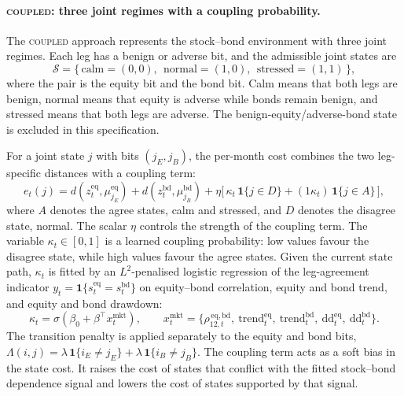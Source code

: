 \documentclass[10pt]{article}
\newcommand{\zeq}{z^{\mathrm{eq}}_t}
\newcommand{\zbd}{z^{\mathrm{bd}}_t}
\newcommand{\Reg}{\mathcal{S}}
\newcommand{\Acoup}{\textsc{coupled}}
\begin{document}
\paragraph{\Acoup{}: three joint regimes with a coupling probability.}
The \Acoup{} approach represents the stock--bond environment with three joint regimes. Each
leg has a benign or adverse bit, and the admissible joint states are
\[
\Reg=\{\,\text{calm}=(0,0),\ \ \text{normal}=(1,0),\ \ \text{stressed}=(1,1)\,\},
\]
where the pair is the equity bit and the bond bit. Calm means that both legs are benign,
normal means that equity is adverse while bonds remain benign, and stressed means that both
legs are adverse. The benign-equity/adverse-bond state is excluded in this specification.

For a joint state $j$ with bits $(j_E,j_B)$, the per-month cost combines the two leg-specific
distances with a coupling term:
\begin{equation}
e_t(j)=d\!\left(\zeq,\mu^{\mathrm{eq}}_{j_E}\right)+d\!\left(\zbd,\mu^{\mathrm{bd}}_{j_B}\right)
+\eta\Big[\,\kappa_t\,\mathbf{1}\{j\in D\}+(1\kappa_t)\,\mathbf{1}\{j\in A\}\,\Big],
\label{eq:emission}
\end{equation}
where $A$ denotes the agree states, calm and stressed, and $D$ denotes the disagree state,
normal. The scalar $\eta$ controls the strength of the coupling term. The variable
$\kappa_t\in[0,1]$ is a learned coupling probability: low values favour the disagree state, while
high values favour the agree states. Given the current state path, $\kappa_t$ is fitted by an
$L^2$-penalised logistic regression of the leg-agreement indicator
$y_t=\mathbf{1}\{s^{\mathrm{eq}}_t=s^{\mathrm{bd}}_t\}$ on equity--bond correlation, equity
and bond trend, and equity and bond drawdown:
\begin{equation}
\kappa_t=\sigma\!\left(\beta_0+\beta^{\top}x^{\mathrm{mkt}}_t\right),\qquad
x^{\mathrm{mkt}}_t=\big\{\rho^{\,\mathrm{eq,bd}}_{12,t},\ \mathrm{trend}^{\mathrm{eq}}_t,\
\mathrm{trend}^{\mathrm{bd}}_t,\ \mathrm{dd}^{\mathrm{eq}}_t,\ \mathrm{dd}^{\mathrm{bd}}_t\big\}.
\label{eq:wt}
\end{equation}
The transition penalty is applied separately to the equity and bond bits,
$\Lambda(i,j)=\lambda\,\mathbf{1}\{i_E\neq j_E\}+\lambda\,\mathbf{1}\{i_B\neq j_B\}$.
The coupling term acts as a soft bias in the state cost. It raises the cost of states that
conflict with the fitted stock--bond dependence signal and lowers the cost of states
supported by that signal.
\end{document}
